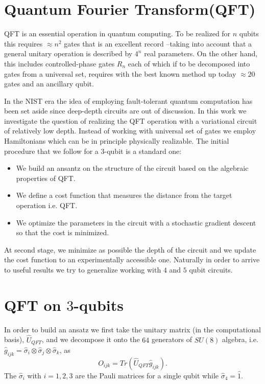 \documentclass[pra,onecolumn,superscriptaddress]{revtex4}%
\begin{document}
\section{Quantum Fourier Transform(QFT)}

QFT is an essential operation in quantum computing. To be realized for $n$ qubits this requires 
$\approx n^2$ gates that is an excellent record --taking into account that a general unitary operation
is described by $4^n$ real parameters. On the other hand, this includes controlled-phase gates $R_n$
each of which if to be decomposed into gates from a universal set, requires with the best known
method up today $\approx 20$ gates and an ancillary qubit. 

In the NIST era the idea of employing fault-tolerant quantum computation has been set aside
since deep-depth circuits are out of discussion. In this work we investigate the question
of realizing the QFT operation with a variational circuit of relatively low depth. Instead of
working with universal set of gates we employ Hamiltonians which can be in principle physically realizable.
 The initial procedure that we follow for a $3$-qubit is a standard one:
\begin{itemize}
	\item We build an ansantz on the structure of the circuit based on the algebraic properties of QFT.
	\item We define a cost function that measures the distance from the target operation i.e. QFT.
	\item We optimize the parameters in the circuit with a stochastic gradient descent so that the cost is minimized. 
\end{itemize}
At second stage, we minimize as possible the depth of the circuit and we update the cost function to an experimentally accessible one.
Naturally in order to arrive to useful results we try to generalize working with $4$ and $5$ qubit circuits.
  
\section{QFT on $3$-qubits} 


In order to build an ansatz we first take the unitary matrix (in the computational basis), $\hat{U}_{QFT}$,
and we decompose it onto the $64$ generators of $SU(8)$ algebra, i.e. $\hat{g}_{ijk}=\hat{\sigma}_{i} \otimes \hat{\sigma}_{j} \otimes \hat{\sigma}_{k}$,
as 
\begin{equation}
O_{ijk}=Tr\left(\hat{U}_{QFT} \hat{g}_{ijk} \right).
\end{equation}
The $\hat{\sigma}_{i}$ with $i=1,2,3$ are the Pauli matrices for a single qubit while $\hat{\sigma}_{4}=\hat{1}$.
\end{document}
